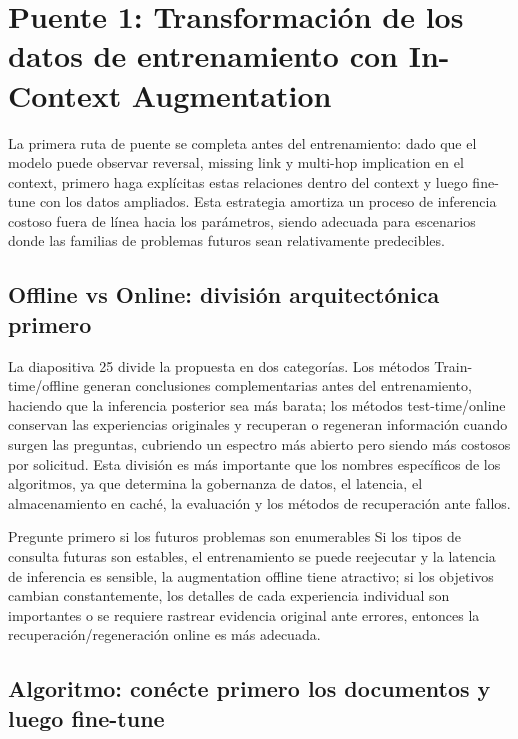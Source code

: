 \section{Puente 1: Transformación de los datos de entrenamiento con In-Context Augmentation}

La primera ruta de puente se completa antes del entrenamiento: dado que el modelo puede observar reversal, missing link y multi-hop implication en el context, primero haga explícitas estas relaciones dentro del context y luego fine-tune con los datos ampliados. Esta estrategia amortiza un proceso de inferencia costoso fuera de línea hacia los parámetros, siendo adecuada para escenarios donde las familias de problemas futuros sean relativamente predecibles.

\subsection{Offline vs Online: división arquitectónica primero}

La diapositiva 25 divide la propuesta en dos categorías. Los métodos Train-time/offline generan conclusiones complementarias antes del entrenamiento, haciendo que la inferencia posterior sea más barata; los métodos test-time/online conservan las experiencias originales y recuperan o regeneran información cuando surgen las preguntas, cubriendo un espectro más abierto pero siendo más costosos por solicitud. Esta división es más importante que los nombres específicos de los algoritmos, ya que determina la gobernanza de datos, el latencia, el almacenamiento en caché, la evaluación y los métodos de recuperación ante fallos.


\begin{importantbox}{Pregunte primero si los futuros problemas son enumerables}
Si los tipos de consulta futuras son estables, el entrenamiento se puede reejecutar y la latencia de inferencia es sensible, la augmentation offline tiene atractivo; si los objetivos cambian constantemente, los detalles de cada experiencia individual son importantes o se requiere rastrear evidencia original ante errores, entonces la recuperación/regeneración online es más adecuada.
\end{importantbox}

\subsection{Algoritmo: conécte primero los documentos y luego fine-tune}

